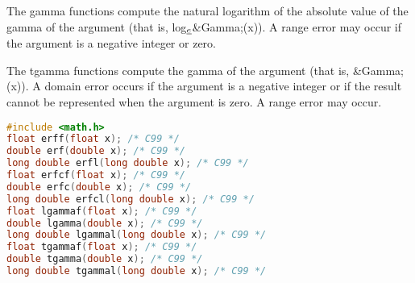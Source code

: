 The gamma functions compute the natural logarithm of the absolute value of the
gamma of the argument (that is,
log\(_{\emph{e}}\)\textbar{}\&Gamma;(x)\textbar{}). A range error may occur if
the argument is a negative integer or zero.

The tgamma functions compute the gamma of the argument (that is, \&Gamma;(x)).
A domain error occurs if the argument is a negative integer or if the result
cannot be represented when the argument is zero. A range error may occur.
\lstset{basicstyle=\scriptsize, numbers=left, captionpos=b, tabsize=4}
\begin{lstlisting}[caption=Section \thesection listing \arabic{furthermathcnt},language={C},
breaklines=true,xleftmargin=15pt,label=lst:section\thesection listing\arabic{furthermathcnt}]
#include <math.h>
float erff(float x); /* C99 */
double erf(double x); /* C99 */
long double erfl(long double x); /* C99 */
float erfcf(float x); /* C99 */
double erfc(double x); /* C99 */
long double erfcl(long double x); /* C99 */
float lgammaf(float x); /* C99 */
double lgamma(double x); /* C99 */
long double lgammal(long double x); /* C99 */
float tgammaf(float x); /* C99 */
double tgamma(double x); /* C99 */
long double tgammal(long double x); /* C99 */
\end{lstlisting}
